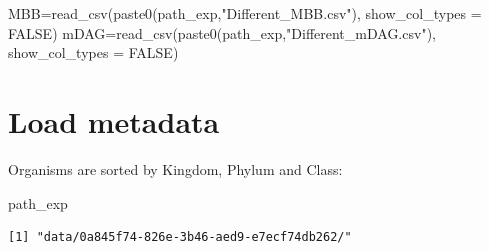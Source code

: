 \documentclass[
  letterpaper,
  DIV=11,
  numbers=noendperiod]{scrreprt}
\newenvironment{Shaded}{}{}
\newcommand{\AttributeTok}[1]{\textcolor[rgb]{0.78,0.47,0.87}{#1}}
\newcommand{\ConstantTok}[1]{\textcolor[rgb]{0.82,0.60,0.40}{#1}}
\newcommand{\FunctionTok}[1]{\textcolor[rgb]{0.38,0.69,0.94}{#1}}
\newcommand{\NormalTok}[1]{\textcolor[rgb]{0.67,0.70,0.75}{#1}}
\newcommand{\OtherTok}[1]{\textcolor[rgb]{0.15,0.68,0.38}{#1}}
\newcommand{\StringTok}[1]{\textcolor[rgb]{0.60,0.76,0.47}{#1}}
\begin{document}
\begin{Shaded}
\begin{Highlighting}[]
\NormalTok{MBB}\OtherTok{=}\FunctionTok{read\_csv}\NormalTok{(}\FunctionTok{paste0}\NormalTok{(path\_exp,}\StringTok{"Different\_MBB.csv"}\NormalTok{),}
             \AttributeTok{show\_col\_types =} \ConstantTok{FALSE}\NormalTok{)}
\NormalTok{mDAG}\OtherTok{=}\FunctionTok{read\_csv}\NormalTok{(}\FunctionTok{paste0}\NormalTok{(path\_exp,}\StringTok{"Different\_mDAG.csv"}\NormalTok{),}
              \AttributeTok{show\_col\_types =} \ConstantTok{FALSE}\NormalTok{)}
\end{Highlighting}
\end{Shaded}

\section{Load metadata}\label{load-metadata}

Organisms are sorted by Kingdom, Phylum and Class:

\begin{Shaded}
\begin{Highlighting}[]
\NormalTok{path\_exp}
\end{Highlighting}
\end{Shaded}

\begin{verbatim}
[1] "data/0a845f74-826e-3b46-aed9-e7ecf74db262/"
\end{verbatim}
\end{document}
